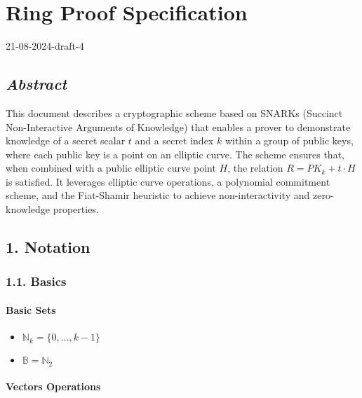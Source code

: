 \documentclass[
]{article}
\author{}
\date{}
\providecommand{\tightlist}{%
  \setlength{\itemsep}{0pt}\setlength{\parskip}{0pt}}
\begin{document}
\hypertarget{ring-proof-specification}{%
\section{Ring Proof Specification}\label{ring-proof-specification}}

21-08-2024-draft-4

\hypertarget{abstract}{%
\subsection{\texorpdfstring{\emph{Abstract}}{Abstract}}\label{abstract}}

This document describes a cryptographic scheme based on SNARKs (Succinct
Non-Interactive Arguments of Knowledge) that enables a prover to
demonstrate knowledge of a secret scalar \(t\) and a secret index \(k\)
within a group of public keys, where each public key is a point on an
elliptic curve. The scheme ensures that, when combined with a public
elliptic curve point \(H\), the relation \(R = PK_k + t·H\) is
satisfied. It leverages elliptic curve operations, a polynomial
commitment scheme, and the Fiat-Shamir heuristic to achieve
non-interactivity and zero-knowledge properties.

\hypertarget{notation}{%
\subsection{1. Notation}\label{notation}}

\hypertarget{basics}{%
\subsubsection{1.1. Basics}\label{basics}}

\hypertarget{basic-sets}{%
\paragraph{Basic Sets}\label{basic-sets}}

\begin{itemize}
\tightlist
\item
  \(\mathbb{N}_k = \{0, \dots, k-1\}\)
\item
  \(\mathbb{B} = \mathbb{N}_2\)
\end{itemize}

\hypertarget{vectors-operations}{%
\paragraph{Vectors Operations}\label{vectors-operations}}
\end{document}
